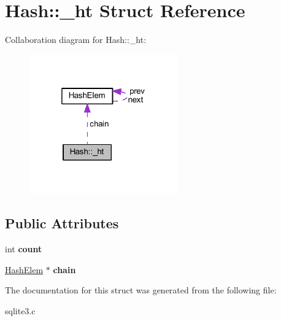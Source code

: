 \hypertarget{struct_hash_1_1__ht}{\section{Hash\-:\-:\-\_\-ht Struct Reference}
\label{struct_hash_1_1__ht}
}


Collaboration diagram for Hash\-:\-:\-\_\-ht\-:\nopagebreak
\begin{figure}[H]
\begin{center}
\leavevmode
\includegraphics[width=181pt]{struct_hash_1_1__ht__coll__graph}
\end{center}
\end{figure}
\subsection*{Public Attributes}
\begin{DoxyCompactItemize}
\item 
\hypertarget{struct_hash_1_1__ht_a0677191178b6c7c5c6c2880f41cf24b1}{int {\bfseries count}}\label{struct_hash_1_1__ht_a0677191178b6c7c5c6c2880f41cf24b1}

\item 
\hypertarget{struct_hash_1_1__ht_a56fc145e7d38d9440d85ab2ea63a48ac}{\hyperlink{struct_hash_elem}{Hash\-Elem} $\ast$ {\bfseries chain}}\label{struct_hash_1_1__ht_a56fc145e7d38d9440d85ab2ea63a48ac}

\end{DoxyCompactItemize}


The documentation for this struct was generated from the following file\-:\begin{DoxyCompactItemize}
\item 
sqlite3.\-c\end{DoxyCompactItemize}
